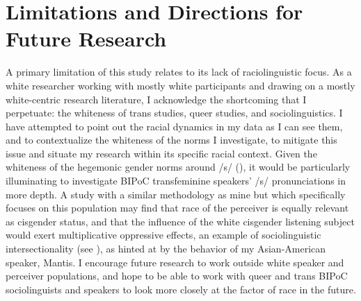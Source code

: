 \documentclass[12pt,twoside]{reedthesis}
\begin{document}

	
\section{Limitations and Directions for Future Research}
A primary limitation of this study relates to its lack of raciolinguistic focus. As a white researcher working with mostly white participants and drawing on a mostly white-centric research literature, I acknowledge the shortcoming that I perpetuate: the whiteness of trans studies, queer studies, and sociolinguistics. I have attempted to point out the racial dynamics in my data as I can see them, and to contextualize the whiteness of the norms I investigate, to mitigate this issue and situate my research within its specific racial context. Given the whiteness of the hegemonic gender norms around /s/ (\cite{steele_enacting_2022, calder_whose_2022}), it would be particularly illuminating to investigate BIPoC transfeminine speakers' /s/ pronunciations in more depth. A study with a similar methodology as mine but which specifically focuses on this population may find that race of the perceiver is equally relevant as cisgender status, and that the influence of the white cisgender listening subject would exert multiplicative oppressive effects, an example of sociolinguistic intersectionality (see \cite{miles-hercules_real_2022}), as hinted at by the behavior of my Asian-American speaker, Mantis. I encourage future research to work outside white speaker and perceiver populations, and hope to be able to work with queer and trans BIPoC sociolinguists and speakers to look more closely at the factor of race in the future.
\end{document}

